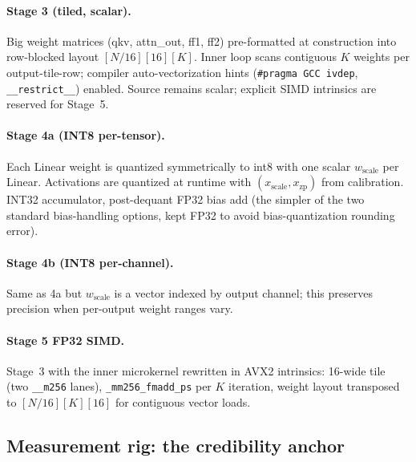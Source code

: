 \documentclass{article}
\begin{document}
\paragraph{Stage 3 (tiled, scalar).}
Big weight matrices (qkv, attn\_out, ff1, ff2) pre-formatted at construction into row-blocked layout $[N/16][16][K]$.
Inner loop scans contiguous $K$ weights per output-tile-row; compiler auto-vectorization hints (\texttt{\#pragma GCC ivdep}, \texttt{\_\_restrict\_\_}) enabled.
Source remains scalar; explicit SIMD intrinsics are reserved for Stage~5.

\paragraph{Stage 4a (INT8 per-tensor).}
Each Linear weight is quantized symmetrically to int8 with one scalar $w_\text{scale}$ per Linear.
Activations are quantized at runtime with $(x_\text{scale}, x_\text{zp})$ from calibration.
INT32 accumulator, post-dequant FP32 bias add (the simpler of the two standard bias-handling options, kept FP32 to avoid bias-quantization rounding error).

\paragraph{Stage 4b (INT8 per-channel).}
Same as 4a but $w_\text{scale}$ is a vector indexed by output channel; this preserves precision when per-output weight ranges vary.

\paragraph{Stage 5 FP32 SIMD.}
Stage~3 with the inner microkernel rewritten in AVX2 intrinsics: 16-wide tile (two \texttt{\_\_m256} lanes), \texttt{\_mm256\_fmadd\_ps} per $K$ iteration, weight layout transposed to $[N/16][K][16]$ for contiguous vector loads.

\subsection{Measurement rig: the credibility anchor}
\label{sec:method:rig}
\end{document}
